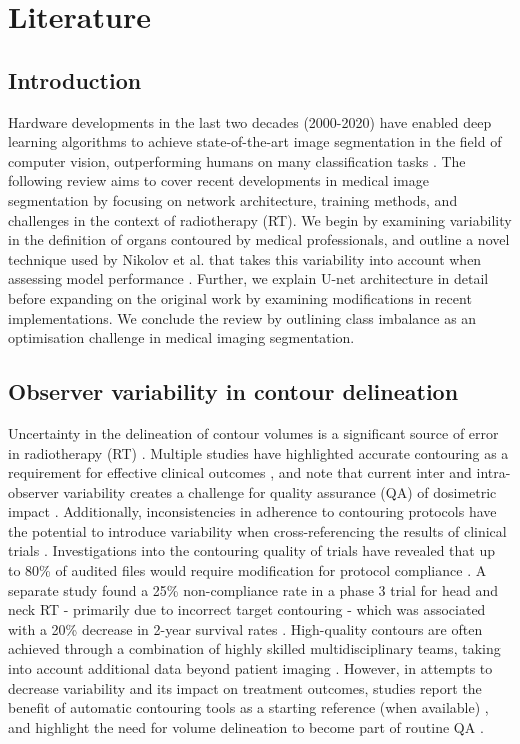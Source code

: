 \chapter{Literature} \label{ch:literature}

\section{Introduction}
Hardware developments in the last two decades (2000-2020) have enabled deep learning algorithms to achieve state-of-the-art image segmentation in the field of computer vision, outperforming humans on many classification tasks \cite{ioffe2015, He2015, Wu2015}. The following review aims to cover recent developments in medical image segmentation by focusing on network architecture, training methods, and challenges in the context of radiotherapy (RT). We begin by examining variability in the definition of organs contoured by medical professionals, and outline a novel technique used by Nikolov et al. that takes this variability into account when assessing model performance \cite{Nikolov_2018}. Further, we explain U-net architecture in detail before expanding on the original work by examining modifications in recent implementations. We conclude the review by outlining class imbalance as an optimisation challenge in medical imaging segmentation.


\section{Observer variability in contour delineation}
 
Uncertainty in the delineation of contour volumes is a significant source of error in radiotherapy (RT) \cite{Nikolov_2018}. Multiple studies have highlighted accurate contouring as a requirement for effective clinical outcomes \cite{Vinod_2016, Roach_2019, Nemoto_2020}, and note that current inter and intra-observer variability creates a challenge for quality assurance (QA) of dosimetric impact \cite{Vinod_2016}. Additionally, inconsistencies in adherence to contouring protocols have the potential to introduce variability when cross-referencing the results of clinical trials \cite{Roach_2019}. Investigations into the contouring quality of trials have revealed that up to 80\% of audited files would require modification for protocol compliance \cite{Kachnic2013}. A separate study found a 25\% non-compliance rate in a phase 3 trial for head and neck RT - primarily due to incorrect target contouring - which was associated with a 20\% decrease in 2-year survival rates \cite{Peters2010}. High-quality contours are often achieved through a combination of highly skilled multidisciplinary teams, taking into account additional data beyond patient imaging \cite{Vinod_2016, Roach_2019}. However, in attempts to decrease variability and its impact on treatment outcomes, studies report the benefit of automatic contouring tools as a starting reference (when available) \cite{Vinod_2016}, and highlight the need for volume delineation to become part of routine QA \cite{Vinod_2016}. 

